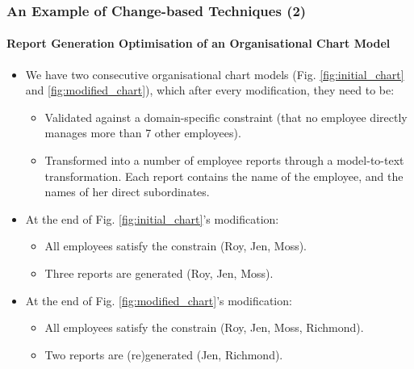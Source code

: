 \documentclass{beamer}
\begin{document}
\begin{frame}
\frametitle{An Example of Change-based Techniques (2)}
\label{sec:An example_of_change-based_techniques_2}
\framesubtitle{Report Generation Optimisation of an Organisational Chart Model}
\begin{itemize}
\item We have two consecutive organisational chart models (Fig. \ref{fig:initial_chart} and \ref{fig:modified_chart}), which after every modification, they need to be:
\begin{itemize}
\item Validated against a domain-specific constraint (that no employee directly manages more than 7 other employees).
\item Transformed into a number of employee reports through a model-to-text transformation. Each report contains the name of the employee, and the names of her direct subordinates.
\end{itemize}
\item At the end of Fig. \ref{fig:initial_chart}'s modification:
\begin{itemize}
\item All employees satisfy the constrain (Roy, Jen, Moss).
\item Three reports are generated (Roy, Jen, Moss).
\end{itemize}
\item At the end of Fig. \ref{fig:modified_chart}'s modification:
    \begin{itemize}
    \item All employees satisfy the constrain (Roy, Jen, Moss, Richmond).
    \item Two reports are (re)generated (Jen, Richmond).
\end{itemize}
\end{itemize}
\end{frame}
\end{document}

